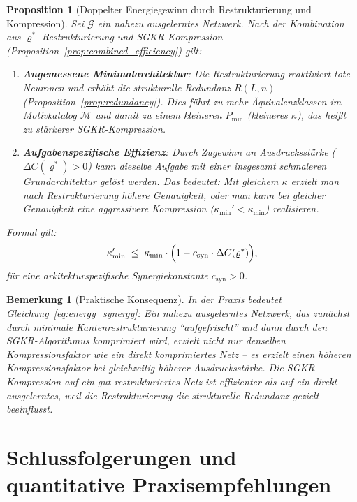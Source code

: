 ﻿\documentclass[12pt, a4paper, openany]{report}
\newtheorem{proposition}[theorem]{Proposition}
\newtheorem{remark}[theorem]{Bemerkung}
\newcommand{\calG}{\mathcal{G}}
\newcommand{\calM}{\mathcal{M}}
\begin{document}
\begin{proposition}[Doppelter Energiegewinn durch Restrukturierung und Kompression]
\label{prop:energy_synergy}
Sei $\calG$ ein nahezu ausgelerntes Netzwerk.  Nach der Kombination aus
$\varrho^*$-Restrukturierung und SGKR-Kompression
(Proposition~\ref{prop:combined_efficiency}) gilt:
\begin{enumerate}[label=(\roman*)]
  \item \textbf{Angemessene Minimalarchitektur}: Die Restrukturierung
    reaktiviert tote Neuronen und erhöht die strukturelle Redundanz $R(L,n)$
    (Proposition~\ref{prop:redundancy}).  Dies führt zu mehr
    Äquivalenzklassen im Motivkatalog $\calM$ und damit zu einem
    kleineren $P_{\min}$ (kleineres $\kappa$), das heißt zu
    \emph{stärkerer SGKR-Kompression}.
  \item \textbf{Aufgabenspezifische Effizienz}: Durch Zugewinn an
    Ausdrucksstärke ($\Delta C(\varrho^*) > 0$) kann dieselbe Aufgabe mit
    einer insgesamt schmaleren Grundarchitektur gelöst werden.  Das bedeutet:
    Mit gleichem $\kappa$ erzielt man nach Restrukturierung höhere
    Genauigkeit, oder man kann bei gleicher Genauigkeit eine aggressivere
    Kompression ($\kappa_{\min}' < \kappa_{\min}$) realisieren.
\end{enumerate}
Formal gilt:
\begin{equation}
  \label{eq:energy_synergy}
  \kappa'_{\min}
  \;\leq\;
  \kappa_{\min} \cdot
  \Bigl(1 - c_{\mathrm{syn}} \cdot \Delta C(\varrho^*)\Bigr),
\end{equation}
für eine arkitekturspezifische Synergiekonstante $c_{\mathrm{syn}} > 0$.
\end{proposition}

\begin{remark}[Praktische Konsequenz]
\label{rem:practical_energy}
In der Praxis bedeutet Gleichung~\eqref{eq:energy_synergy}: Ein nahezu
ausgelerntes Netzwerk, das zunächst durch minimale Kantenrestrukturierung
``aufgefrischt'' und dann durch den SGKR-Algorithmus komprimiert wird,
erzielt nicht nur denselben Kompressionsfaktor wie ein direkt komprimiertes
Netz -- es erzielt einen \emph{höheren} Kompressionsfaktor bei
gleichzeitig \emph{höherer} Ausdrucksstärke.  Die SGKR-Kompression auf ein
gut restrukturiertes Netz ist effizienter als auf ein direkt ausgelerntes,
weil die Restrukturierung die strukturelle Redundanz gezielt beeinflusst.
\end{remark}

\section{Schlussfolgerungen und quantitative Praxisempfehlungen}
\label{sec:energy_conclusions}
\end{document}
